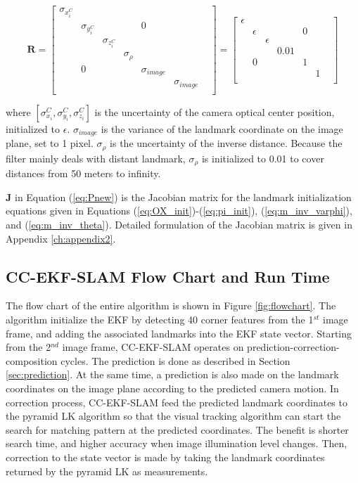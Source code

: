 \begin{equation}
\label{eq:R}
\boldsymbol{R}=\begin{bmatrix}
\sigma _{x_{i}^{C}} & & & & & & \\
 & \sigma _{y_{i}^{C}} & & & 0 & & \\
 & & \sigma _{z_{i}^{C}} & & & & \\
 & & & \sigma _{\rho } & & & \\
 & 0 & & & \sigma _{image} & & \\
 & & & & & \sigma _{image} & \\
\end{bmatrix}
 = \begin{bmatrix}
\epsilon & & & & & & \\
 & \epsilon & & & 0 & & \\
 & & \epsilon & & & & \\
 & & & 0.01 & & & \\
 & 0 & & & 1 & & \\
 & & & & & 1 & \\
\end{bmatrix} 
\end{equation}

\noindent where $[\sigma_{x_{i}}^{C}, \sigma_{y_{i}}^{C}, \sigma
_{z_{i}}^{C}]$ is the uncertainty of the camera optical center
position, initialized to $\epsilon$. $\sigma_{image}$ is the variance
of the landmark coordinate on the image plane, set to 1 pixel. $\sigma
_{\rho }$ is the uncertainty of the inverse distance. Because the
filter mainly deals with distant landmark, $ \sigma _{\rho }$ is
initialized to 0.01 to cover distances from 50 meters to infinity.

$\boldsymbol{J}$ in Equation (\ref{eq:Pnew}) is the Jacobian matrix
for the landmark initialization equations given in Equations
(\ref{eq:OX_init})-(\ref{eq:pi_init}), (\ref{eq:m_inv_varphi}), and
(\ref{eq:m_inv_theta}). Detailed formulation of the Jacobian matrix is
given in Appendix \ref{ch:appendix2}.



\subsection{CC-EKF-SLAM Flow Chart and Run Time}
The flow chart of the entire algorithm is shown in Figure
\ref{fig:flowchart}. The algorithm initialize the EKF by detecting 40
corner features from the 1$^{st}$ image frame, and adding the
associated landmarks into the EKF state vector. Starting from the
2$^{nd}$ image frame, CC-EKF-SLAM operates on
prediction-correction-composition cycles. The prediction is done as
described in Section \ref{sec:prediction}. At the same time, a
prediction is also made on the landmark coordinates on the image plane
according to the predicted camera motion. In correction process,
CC-EKF-SLAM feed the predicted landmark coordinates to the pyramid LK
algorithm so that the visual tracking algorithm can start the search
for matching pattern at the predicted coordinates. The benefit is
shorter search time, and higher accuracy when image illumination level
changes. Then, correction to the state vector is made by taking the
landmark coordinates returned by the pyramid LK as measurements.

